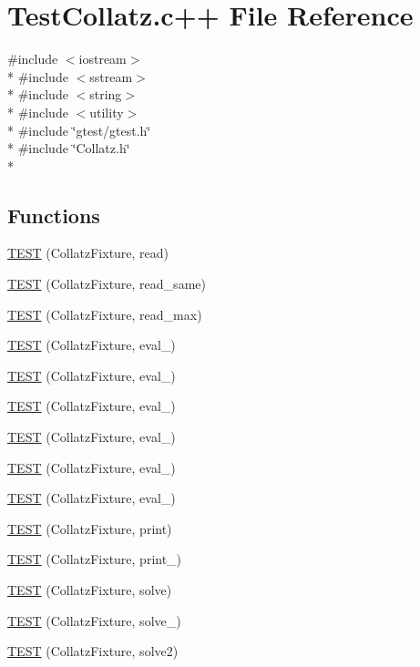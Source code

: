 \hypertarget{TestCollatz_8c_09_09}{\section{Test\-Collatz.\-c++ File Reference}
\label{TestCollatz_8c_09_09}
}
{\ttfamily \#include $<$iostream$>$}\\*
{\ttfamily \#include $<$sstream$>$}\\*
{\ttfamily \#include $<$string$>$}\\*
{\ttfamily \#include $<$utility$>$}\\*
{\ttfamily \#include \char`\"{}gtest/gtest.\-h\char`\"{}}\\*
{\ttfamily \#include \char`\"{}Collatz.\-h\char`\"{}}\\*
\subsection*{Functions}
\begin{DoxyCompactItemize}
\item 
\hyperlink{TestCollatz_8c_09_09_a528303af22c7c5a550af7342092a9f05}{T\-E\-S\-T} (Collatz\-Fixture, read)
\item 
\hyperlink{TestCollatz_8c_09_09_ae622478e9ecf1be34a9cf6a4865cf9ce}{T\-E\-S\-T} (Collatz\-Fixture, read\-\_\-same)
\item 
\hyperlink{TestCollatz_8c_09_09_af2ba955cadfd05c150743be1cb62c866}{T\-E\-S\-T} (Collatz\-Fixture, read\-\_\-max)
\item 
\hyperlink{TestCollatz_8c_09_09_aa0fcdadaf0d4f7fe0919c37746fe7c74}{T\-E\-S\-T} (Collatz\-Fixture, eval\-\_)
\item 
\hyperlink{TestCollatz_8c_09_09_a333bb6921f06fa177e9818dbcf3eda06}{T\-E\-S\-T} (Collatz\-Fixture, eval\-\_)
\item 
\hyperlink{TestCollatz_8c_09_09_a251001c75c1226c607534268ab3a5bcb}{T\-E\-S\-T} (Collatz\-Fixture, eval\-\_)
\item 
\hyperlink{TestCollatz_8c_09_09_a033aa388470c35adc9579303dba1afa2}{T\-E\-S\-T} (Collatz\-Fixture, eval\-\_)
\item 
\hyperlink{TestCollatz_8c_09_09_ab529bbfe532bd0b6fbc11c51fe0af7e5}{T\-E\-S\-T} (Collatz\-Fixture, eval\-\_)
\item 
\hyperlink{TestCollatz_8c_09_09_adebb7237f2a00c256cd0c733885ccd58}{T\-E\-S\-T} (Collatz\-Fixture, eval\-\_)
\item 
\hyperlink{TestCollatz_8c_09_09_a1be21485425cf43808a497ed8ef4d418}{T\-E\-S\-T} (Collatz\-Fixture, print)
\item 
\hyperlink{TestCollatz_8c_09_09_a710b14401102f6b4647268dd499a6c63}{T\-E\-S\-T} (Collatz\-Fixture, print\-\_)
\item 
\hyperlink{TestCollatz_8c_09_09_a07f06cda216730b4038ffd06db5a3d1f}{T\-E\-S\-T} (Collatz\-Fixture, solve)
\item 
\hyperlink{TestCollatz_8c_09_09_a231d54f2c8c30622abc04e3e0fddb29f}{T\-E\-S\-T} (Collatz\-Fixture, solve\-\_)
\item 
\hyperlink{TestCollatz_8c_09_09_af3c5c7bbcab1bd27e51f879724f835ee}{T\-E\-S\-T} (Collatz\-Fixture, solve2)
\end{DoxyCompactItemize}


